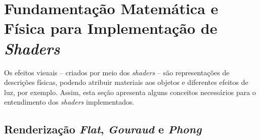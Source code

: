 \section{Fundamentação Matemática e Física para Implementação de \textit{Shaders}}
\label{teoria}

	Os efeitos visuais -- criados por meio dos \textit{shaders} -- são representações de descrições físicas, podendo atribuir materiais aos objetos e diferentes efeitos de luz, por exemplo. Assim, esta seção apresenta alguns conceitos necessários para o entendimento dos \textit{shaders} implementados.

	\subsection{Renderização \textit{Flat}, \textit{Gouraud} e \textit{Phong}}
	\label{flatgouphon}

